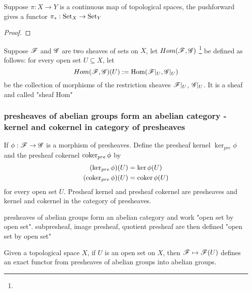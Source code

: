 \begin{proposition}
	Suppose $\pi: X \to Y$ is a continuous map of topological spaces, the pushforward gives a functor $\pi_*: \operatorname{Set}_X \to \operatorname{Set}_Y$
\end{proposition}

\begin{proof}
\end{proof}

\begin{definition}
	Suppose $\mathscr{F}$ and $\mathscr{G}$ are two sheaves of sets on $X$, let $Hom(\mathscr{F}, \mathscr{G})$ \footnote{} be defined as follows: for every open set $U \subseteq X$, let
	$$
		Hom(\mathscr{F}, \mathscr{G})(U) := \operatorname{Hom}(\mathscr{F}\vert_U, \mathscr{G}\vert_U)
	$$
	be the collection of morphisms of the restriction sheaves $\mathscr{F}\vert_U$, $\mathscr{G}\vert_U$. It is a sheaf and called "sheaf Hom"
\end{definition}

\subsubsection{presheaves of abelian groups form an abelian category - kernel and cokernel in category of presheaves}

\begin{definition}
	If $\phi: \mathscr{F} \to \mathscr{G}$ is a morphism of presheaves. Define the presheaf kernel $\ker_{pre} \phi$ and the presheaf cokernel $\operatorname{coker}_{pre} \phi$ by
	\begin{align*}
		(\ker_{pre} \phi)(U) &= \ker \phi(U) \\
		(\operatorname{coker}_{pre} \phi)(U) &= \operatorname{coker} \phi(U)
	\end{align*}
	for every open set $U$. Presheaf kernel and presheaf cokernel are presheaves and kernel and cokernel in the category of presheaves.
\end{definition}

\begin{remark}
	presheaves of abelian groups form an abelian category and work "open set by open set". subpresheaf, image presheaf, quotient presheaf are then defined "open set by open set"
\end{remark}

\begin{proposition}
	Given a topological space $X$, if $U$ is an open set on $X$, then $\mathscr{F} \mapsto \mathscr{F}(U)$ defines an exact functor from presheaves of abelian groups into abelian groups.
\end{proposition}

